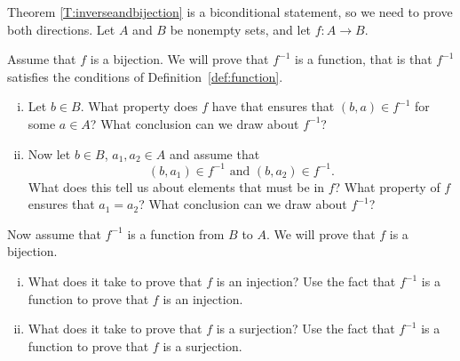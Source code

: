 \begin{activity} Theorem \ref{T:inverseandbijection} is a biconditional statement, so we need to prove both directions. Let  $A$  and  $B$  be nonempty sets, and let  $f: A \to B$.
	\ba
	\item Assume that  $f$  is a bijection. We will prove that $f^{-1}$ is a function, that is that $f^{-1} $ satisfies the conditions of Definition~\ref{def:function}. 
		\begin{enumerate}[i.]
		\item Let $b \in B$. What property does $f$ have that ensures that $(b,a) \in f^{-1}$ for some $a \in A$? What conclusion can we draw about $f^{-1}$? 

		\item Now let $b \in B$, $a_1 , a_2  \in A$ and assume that  
\[( {b, a_1 } ) \in f^{ - 1} \text{ and } ( {b, a_2 } ) \in f^{-1}.\]
What does this tell us about elements that must be in $f$? What property of $f$ ensures that $a_1=a_2$? What conclusion can we draw about $f^{-1}$? 

		\end{enumerate}
		
	\item Now assume that  $f^{-1} $  is a function from $B$ to $A$. We will prove that $f$ is a bijection.
			\begin{enumerate}[i.]
			\item What does it take to prove that $f$ is an injection? Use the fact that $f^{-1}$ is a function to prove that $f$ is an injection.
						
			\item What does it take to prove that $f$ is a surjection? Use the fact that $f^{-1}$ is a function to prove that $f$ is a surjection.
						
			\end{enumerate}
			
		\ea
\end{activity}


